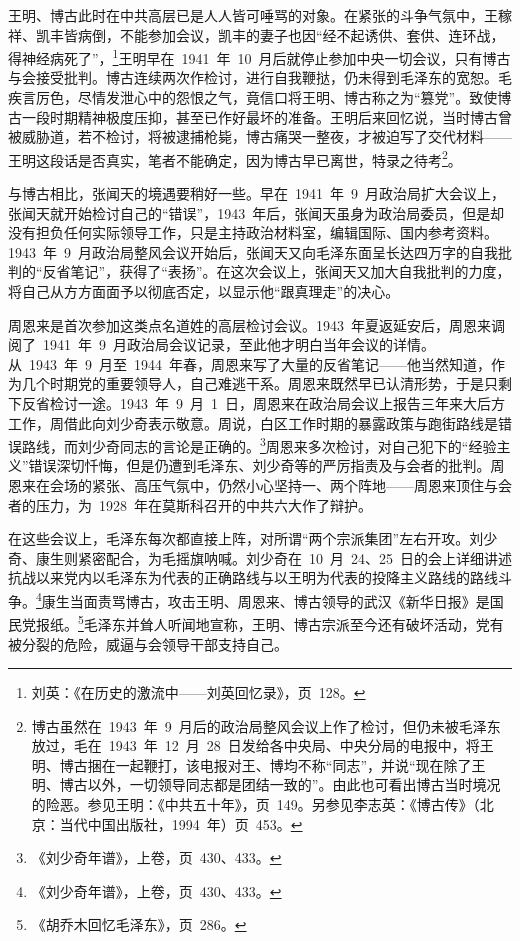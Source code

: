 王明、博古此时在中共高层已是人人皆可唾骂的对象。在紧张的斗争气氛中，王稼祥、凯丰皆病倒，不能参加会议，凯丰的妻子也因“经不起诱供、套供、连环战，得神经病死了”，\footnote{刘英：《在历史的激流中——刘英回忆录》，页~128。}王明早在~1941~年~10~月后就停止参加中央一切会议，只有博古与会接受批判。博古连续两次作检讨，进行自我鞭挞，仍未得到毛泽东的宽恕。毛疾言厉色，尽情发泄心中的怨恨之气，竟信口将王明、博古称之为“篡党”。致使博古一段时期精神极度压抑，甚至已作好最坏的准备。王明后来回忆说，当时博古曾被威胁道，若不检讨，将被逮捕枪毙，博古痛哭一整夜，才被迫写了交代材料——王明这段话是否真实，笔者不能确定，因为博古早已离世，特录之待考\footnote{博古虽然在~1943~年~9~月后的政治局整风会议上作了检讨，但仍未被毛泽东放过，毛在~1943~年~12~月~28~日发给各中央局、中央分局的电报中，将王明、博古捆在一起鞭打，该电报对王、博均不称“同志”，并说“现在除了王明、博古以外，一切领导同志都是团结一致的”。由此也可看出博古当时境况的险恶。参见王明：《中共五十年》，页~149。另参见李志英：《博古传》（北京：当代中国出版社，1994~年）页~453。}。

与博古相比，张闻天的境遇要稍好一些。早在~1941~年~9~月政治局扩大会议上，张闻天就开始检讨自己的“错误”，1943~年后，张闻天虽身为政治局委员，但是却没有担负任何实际领导工作，只是主持政治材料室，编辑国际、国内参考资料。1943~年~9~月政治局整风会议开始后，张闻天又向毛泽东面呈长达四万字的自我批判的“反省笔记”，获得了“表扬”。在这次会议上，张闻天又加大自我批判的力度，将自己从方方面面予以彻底否定，以显示他“跟真理走”的决心。

周恩来是首次参加这类点名道姓的高层检讨会议。1943~年夏返延安后，周恩来调阅了~1941~年~9~月政治局会议记录，至此他才明白当年会议的详情。从~1943~年~9~月至~1944~年春，周恩来写了大量的反省笔记——他当然知道，作为几个时期党的重要领导人，自己难逃干系。周恩来既然早已认清形势，于是只剩下反省检讨一途。1943~年~9~月~1~日，周恩来在政治局会议上报告三年来大后方工作，周借此向刘少奇表示敬意。周说，白区工作时期的暴露政策与跑街路线是错误路线，而刘少奇同志的言论是正确的。\footnote{《刘少奇年谱》，上卷，页~430、433。}周恩来多次检讨，对自己犯下的“经验主义”错误深切忏悔，但是仍遭到毛泽东、刘少奇等的严厉指责及与会者的批判。周恩来在会场的紧张、高压气氛中，仍然小心坚持一、两个阵地——周恩来顶住与会者的压力，为~1928~年在莫斯科召开的中共六大作了辩护。

在这些会议上，毛泽东每次都直接上阵，对所谓“两个宗派集团”左右开攻。刘少奇、康生则紧密配合，为毛摇旗呐喊。刘少奇在~10~月~24、25~日的会上详细讲述抗战以来党内以毛泽东为代表的正确路线与以王明为代表的投降主义路线的路线斗争。\footnote{《刘少奇年谱》，上卷，页~430、433。}康生当面责骂博古，攻击王明、周恩来、博古领导的武汉《新华日报》是国民党报纸。\footnote{《胡乔木回忆毛泽东》，页~286。}毛泽东并耸人听闻地宣称，王明、博古宗派至今还有破坏活动，党有被分裂的危险，威逼与会领导干部支持自己。

